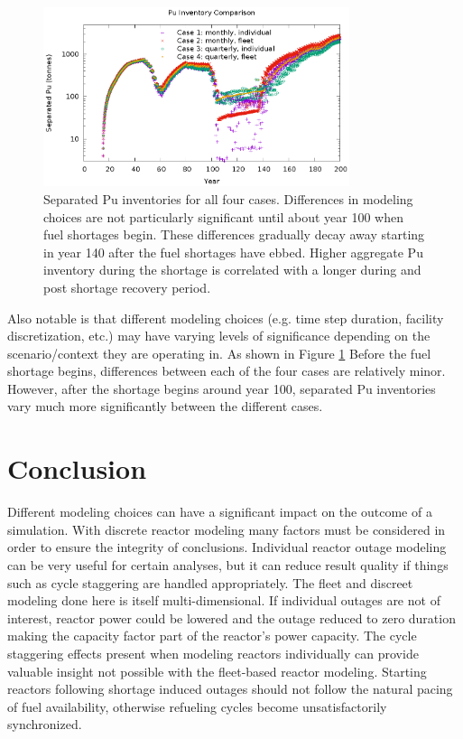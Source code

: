 \documentclass{style}
\begin{document}
\begin{figure}[!h]
    \centering
    \includegraphics[width=0.8\textwidth]{exp2/puinv-compare.eps}
    \caption{
        Separated Pu inventories for all four cases.  Differences in modeling
        choices are not particularly significant until about year 100 when
        fuel shortages begin.  These differences gradually decay away starting
        in year 140 after the fuel shortages have ebbed.  Higher aggregate Pu
        inventory  during the shortage is correlated with a longer during and
        post shortage recovery period.
    }
    \label{fig:puinv-compare}
\end{figure}

Also notable is that different modeling choices (e.g. time step duration,
facility discretization, etc.) may have varying levels of significance
depending on the scenario/context they are operating in.  As shown in Figure
\ref{fig:puinv-compare} Before the fuel shortage begins, differences between
each of the four cases are relatively minor.  However, after the shortage
begins around year 100, separated Pu inventories vary much more significantly
between the different cases.

\section{Conclusion}

Different modeling choices can have a significant impact on the outcome of a
simulation.  With discrete reactor modeling many factors must be considered in
order to ensure the integrity of conclusions.  Individual reactor outage
modeling can be very useful for certain analyses, but it can reduce result
quality if things such as cycle staggering are handled appropriately.  The
fleet and discreet modeling done here is itself multi-dimensional.  If
individual outages are not of interest, reactor power could be lowered and the
outage reduced to zero duration making the capacity factor part of the
reactor's power capacity.  The cycle staggering effects present when modeling
reactors individually can provide valuable insight not possible with the
fleet-based reactor modeling.  Starting reactors following shortage induced
outages should not follow the natural pacing of fuel availability, otherwise
refueling cycles become unsatisfactorily synchronized.
\end{document}
